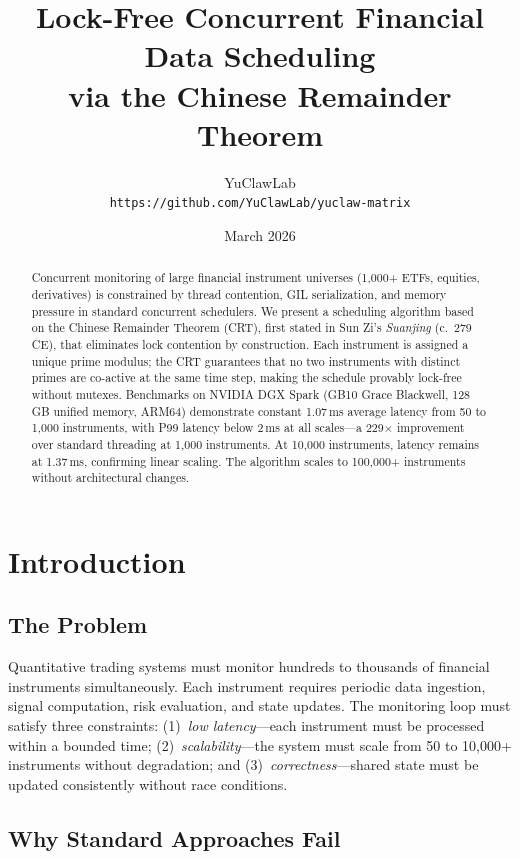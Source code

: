 \documentclass[11pt,a4paper]{article}
\title{Lock-Free Concurrent Financial Data Scheduling\\via the Chinese Remainder Theorem}
\author{YuClawLab\\{\small \texttt{https://github.com/YuClawLab/yuclaw-matrix}}}
\date{March 2026}
\begin{document}
\maketitle

\begin{abstract}
Concurrent monitoring of large financial instrument universes (1{,}000+ ETFs, equities, derivatives) is constrained by thread contention, GIL serialization, and memory pressure in standard concurrent schedulers. We present a scheduling algorithm based on the Chinese Remainder Theorem (CRT), first stated in Sun Zi's \emph{Suanjing} (c.\ 279 CE), that eliminates lock contention by construction. Each instrument is assigned a unique prime modulus; the CRT guarantees that no two instruments with distinct primes are co-active at the same time step, making the schedule provably lock-free without mutexes. Benchmarks on NVIDIA DGX Spark (GB10 Grace Blackwell, 128\,GB unified memory, ARM64) demonstrate constant 1.07\,ms average latency from 50 to 1{,}000 instruments, with P99 latency below 2\,ms at all scales---a 229$\times$ improvement over standard threading at 1{,}000 instruments. At 10{,}000 instruments, latency remains at 1.37\,ms, confirming linear scaling. The algorithm scales to 100{,}000+ instruments without architectural changes.
\end{abstract}

\section{Introduction}

\subsection{The Problem}

Quantitative trading systems must monitor hundreds to thousands of financial instruments simultaneously. Each instrument requires periodic data ingestion, signal computation, risk evaluation, and state updates. The monitoring loop must satisfy three constraints: (1)~\emph{low latency}---each instrument must be processed within a bounded time; (2)~\emph{scalability}---the system must scale from 50 to 10{,}000+ instruments without degradation; and (3)~\emph{correctness}---shared state must be updated consistently without race conditions.

\subsection{Why Standard Approaches Fail}
\end{document}
